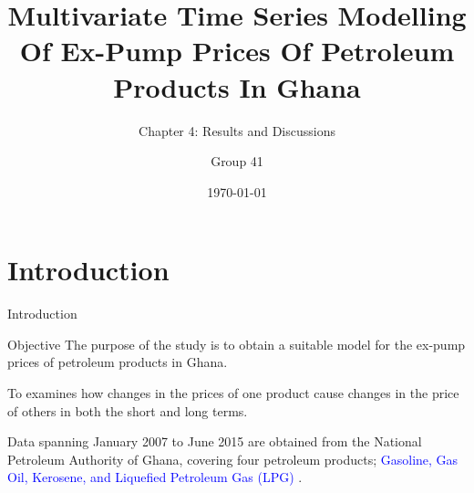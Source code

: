 \documentclass{beamer}
\title{Multivariate Time Series Modelling Of Ex-Pump Prices Of Petroleum Products In Ghana}
\subtitle{Chapter 4: Results and Discussions}
\author{Group 41}
\institute{Kwame Nkrumah University of Science and Technology}
\date{\today}
\begin{document}
	
	
	\begin{frame}
		\titlepage
	\end{frame}
	
	\section{Introduction}
	\begin{frame}{Introduction}
		
		\begin{exampleblock}{Objective}
			The purpose of the study is to obtain a suitable model for the ex-pump prices of petroleum products in Ghana. 
		\end{exampleblock} \vspace{5pt}
		
		To examines how changes in the prices of one product cause changes in the price of others in both the short and long terms. \par \vspace{5pt}
		
		Data spanning January 2007 to June 2015 are obtained from the National Petroleum Authority of Ghana, covering four petroleum products; \textcolor{blue}{Gasoline, Gas Oil, Kerosene, and Liquefied Petroleum Gas (LPG) }. 
	\end{frame}
	
	
	
	
	
	
	
	
	
	
	
	
	
	
	
	
	
	
	
	
	
	
	
	
	
	
\end{document}
